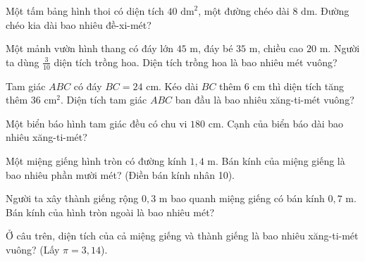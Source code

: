 \begin{ex}
  Một tấm bảng hình thoi có diện tích $40\text{ dm}^2$, một đường chéo dài $8\text{ dm}$. Đường chéo kia dài bao nhiêu đề-xi-mét?
\end{ex}

\begin{ex}
  Một mảnh vườn hình thang có đáy lớn $45\text{ m}$, đáy bé $35\text{ m}$, chiều cao $20\text{ m}$. Người ta dùng $\frac{3}{10}$ diện tích trồng hoa. Diện tích trồng hoa là bao nhiêu mét vuông?
\end{ex}

\begin{ex}
  Tam giác $ABC$ có đáy $BC = 24\text{ cm}$. Kéo dài $BC$ thêm $6\text{ cm}$ thì diện tích tăng thêm $36\text{ cm}^2$. Diện tích tam giác $ABC$ ban đầu là bao nhiêu xăng-ti-mét vuông?
\end{ex}

\begin{ex}
  Một biển báo hình tam giác đều có chu vi $180\text{ cm}$. Cạnh của biển báo dài bao nhiêu xăng-ti-mét?
\end{ex}

\begin{ex}
  Một miệng giếng hình tròn có đường kính $1{,}4\text{ m}$. Bán kính của miệng giếng là bao nhiêu phần mười mét? (Điền bán kính nhân 10).
\end{ex}

\begin{ex}
  Người ta xây thành giếng rộng $0{,}3\text{ m}$ bao quanh miệng giếng có bán kính $0{,}7\text{ m}$. Bán kính của hình tròn ngoài là bao nhiêu mét?
\end{ex}

\begin{ex}
  Ở câu trên, diện tích của cả miệng giếng và thành giếng là bao nhiêu xăng-ti-mét vuông? (Lấy $\pi = 3{,}14$).
\end{ex}

